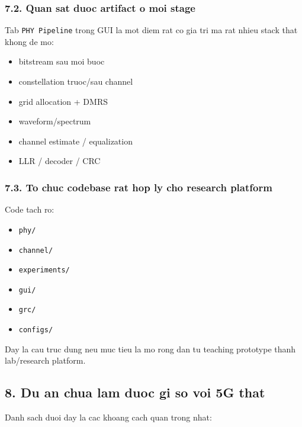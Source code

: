 \documentclass[
  vietnamese,
  a4paper,
  11pt]{article}
\providecommand{\tightlist}{%
  \setlength{\itemsep}{0pt}\setlength{\parskip}{0pt}}
\begin{document}
\subsubsection{7.2. Quan sat duoc artifact o moi
stage}\label{quan-sat-duoc-artifact-o-moi-stage}

Tab \texttt{PHY\ Pipeline} trong GUI la mot diem rat co gia tri ma rat
nhieu stack that khong de mo:

\begin{itemize}
\tightlist
\item
  bitstream sau moi buoc
\item
  constellation truoc/sau channel
\item
  grid allocation + DMRS
\item
  waveform/spectrum
\item
  channel estimate / equalization
\item
  LLR / decoder / CRC
\end{itemize}

\subsubsection{7.3. To chuc codebase rat hop ly cho research
platform}\label{to-chuc-codebase-rat-hop-ly-cho-research-platform}

Code tach ro:

\begin{itemize}
\tightlist
\item
  \texttt{phy/}
\item
  \texttt{channel/}
\item
  \texttt{experiments/}
\item
  \texttt{gui/}
\item
  \texttt{grc/}
\item
  \texttt{configs/}
\end{itemize}

Day la cau truc dung neu muc tieu la mo rong dan tu teaching prototype
thanh lab/research platform.

\subsection{8. Du an chua lam duoc gi so voi 5G
that}\label{du-an-chua-lam-duoc-gi-so-voi-5g-that}

Danh sach duoi day la cac khoang cach quan trong nhat:
\end{document}
